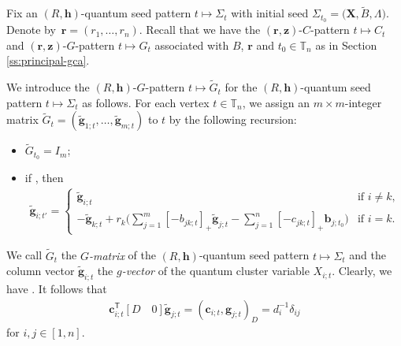 \documentclass[11pt]{article}
\numberwithin{equation}{section}
\numberwithin{equation}{section}
\begin{document}
Fix an $(R,\mathbf{h})$-quantum seed pattern $t\mapsto \Sigma_t$ with initial seed $\Sigma_{t_0}=\bigl(\mathbf{X},\tilde{B},\Lambda\bigr)$. Denote by~${\mathbf{r}=(r_1,\dots, r_n)}$. Recall that we have the $(\mathbf{r},\mathbf{z})$-$C$-pattern $t\mapsto C_t$ and $(\mathbf{r},\mathbf{z})$-$G$-pattern $t\mapsto G_t$ associated with $B$, $\mathbf{r}$ and $t_0\in \mathbb{T}_n$ as in Section \ref{ss:principal-gca}.

We introduce the $(R,\mathbf{h})$-$G$-pattern $t\mapsto \tilde{G}_t$ for the $(R,\mathbf{h})$-quantum seed pattern $t\mapsto \Sigma_t$ as follows.
 For each vertex $t\in \mathbb{T}_n$, we assign an $m\times m$-integer matrix $\tilde{G}_t=(\tilde{\mathbf{g}}_{1;t},\dots, \tilde{\mathbf{g}}_{m;t})$ to $t$ by the following recursion:
\begin{itemize}\itemsep=0pt
 \item[(1)] $\tilde{G}_{t_0}=I_m$;
 \item[(2)] if , then
 \begin{align}\label{eq:g-formula}
 \mathbf{\tilde{g}}_{i;t'}=
 \begin{cases}
 \mathbf{\tilde{g}}_{i;t} & \text{if } i\neq k,\\
 \displaystyle -\mathbf{\tilde{g}}_{k;t}+r_{k}\biggl(\sum\limits_{j=1}^{m}[-b_{jk;t}]_+\mathbf{\tilde{g}}_{j;t}-\sum\limits_{j=1}^{n}[- c_{jk;t}]_+\mathbf{b}_{j;t_0}\biggr) & \text{if }i=k.
 \end{cases}
 \end{align}

\end{itemize}
We call $\tilde{G}_t$ the {\it $G$-matrix} of the $(R,\mathbf{h})$-quantum seed pattern $t\mapsto \Sigma_t$ and the column vector $\tilde{\mathbf{g}}_{i;t}$ the {\it $g$-vector} of the quantum cluster variable $X_{i;t}$.
Clearly, we have . It follows that
\begin{align}\label{D_form_duality}
 \mathbf{c}^{\mathsf T}_{i;t}[D\quad 0]\mathbf{\tilde{g}}_{j;t}=(\mathbf{c}_{i;t},\mathbf{g}_{j;t})_D=d_{i}^{-1}\delta_{ij}
\end{align}
for $i,j\in[1,n]$.
\end{document}
